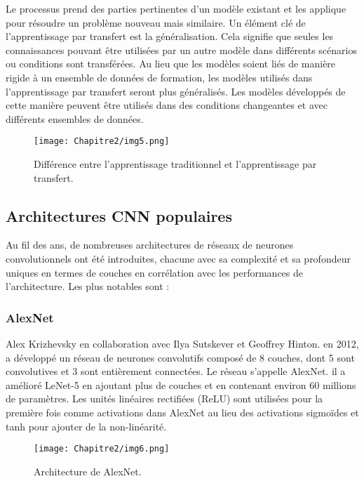      Le processus prend des parties pertinentes d'un modèle existant et les applique pour résoudre un problème nouveau mais similaire. Un élément clé de l'apprentissage par transfert est la généralisation. Cela signifie que seules les connaissances pouvant être utilisées par un autre modèle dans différents scénarios ou conditions sont transférées. Au lieu que les modèles soient liés de manière rigide à un ensemble de données de formation, les modèles utilisés dans l'apprentissage par transfert seront plus généralisés. Les modèles développés de cette manière peuvent être utilisés dans des conditions changeantes et avec différents ensembles de données.
     \begin{figure}[H]
          \centering
          \texttt{[image: Chapitre2/img5.png]}
          \caption{Différence entre l'apprentissage traditionnel et l'apprentissage par transfert.}
          \label{img5}
          \end{figure}

     \subsection{Architectures CNN populaires} 
     Au fil des ans, de nombreuses architectures de réseaux de neurones convolutionnels ont été introduites, chacune avec sa complexité et sa profondeur uniques en termes de couches en corrélation avec les performances de l'architecture. Les plus notables sont :
     
          \subsubsection{AlexNet} \cite{alex_paper}
          Alex Krizhevsky en collaboration avec Ilya Sutskever et Geoffrey Hinton. en 2012, a développé un réseau de neurones convolutifs composé de 8 couches, dont 5 sont convolutives et 3 sont entièrement connectées. Le réseau s'appelle AlexNet. il a amélioré LeNet-5 en ajoutant plus de couches et en contenant environ 60 millions de paramètres. Les unités linéaires rectifiées (ReLU) sont utilisées pour la première fois comme activations dans AlexNet au lieu des activations sigmoïdes et tanh pour ajouter de la non-linéarité.
          \begin{figure}[H]
               \centering
               \texttt{[image: Chapitre2/img6.png]}
               \caption{Architecture de AlexNet.}
               \label{img6}
               \end{figure}

